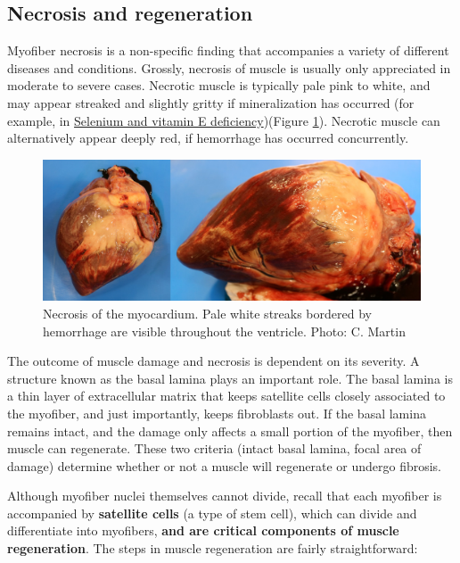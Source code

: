 \documentclass[openany]{report}
\begin{document}
\hypertarget{necrosis-and-regeneration}{\subsection{Necrosis and
regeneration}\label{necrosis-and-regeneration}}

Myofiber necrosis is a non-specific finding that accompanies a variety
of different diseases and conditions. Grossly, necrosis of muscle is
usually only appreciated in moderate to severe cases. Necrotic muscle is
typically pale pink to white, and may appear streaked and slightly
gritty if mineralization has occurred (for example, in
\protect\hyperlink{selenium-and-vitamin-e-deficiency}{Selenium and
vitamin E deficiency})(Figure \ref{fig:heart-necrosis}). Necrotic muscle
can alternatively appear deeply red, if hemorrhage has occurred
concurrently.

\begin{figure}

{\centering \includegraphics[width=0.6\linewidth]{images/heart-necrosis-comp} 

}

\caption{Necrosis of the myocardium. Pale white streaks bordered by hemorrhage are visible throughout the ventricle. Photo: C. Martin}\label{fig:heart-necrosis}
\end{figure}

The outcome of muscle damage and necrosis is dependent on its severity.
A structure known as the basal lamina plays an important role. The basal
lamina is a thin layer of extracellular matrix that keeps satellite
cells closely associated to the myofiber, and just importantly, keeps
fibroblasts out. If the basal lamina remains intact, and the damage only
affects a small portion of the myofiber, then muscle can regenerate.
These two criteria (intact basal lamina, focal area of damage) determine
whether or not a muscle will regenerate or undergo fibrosis.

Although myofiber nuclei themselves cannot divide, recall that each
myofiber is accompanied by \textbf{satellite cells} (a type of stem
cell), which can divide and differentiate into myofibers, \textbf{and
are critical components of muscle regeneration}. The steps in muscle
regeneration are fairly straightforward:
\end{document}
